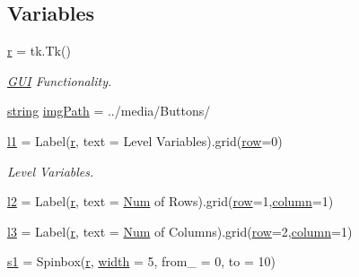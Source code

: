 \subsection*{Variables}
\begin{DoxyCompactItemize}
\item 
\mbox{\hyperlink{namespace_g_u_i_a75551f8a671434e8c984ec81add33a23}{r}} = tk.\+Tk()
\begin{DoxyCompactList}\small\item\em \mbox{\hyperlink{namespace_g_u_i}{G\+UI}} Functionality. \end{DoxyCompactList}\item 
\mbox{\hyperlink{asdl_8h_ae84541b4f3d8e1ea24ec0f466a8c568b}{string}} \mbox{\hyperlink{namespace_g_u_i_a293e22c0a27a45862ad50fcb8ed12f15}{img\+Path}} = \textquotesingle{}../media/Buttons/\textquotesingle{}
\item 
\mbox{\hyperlink{namespace_g_u_i_a95a82d369df3d4c7b727a9411b5200bf}{l1}} = Label(\mbox{\hyperlink{_s_d_l__opengl_8h_a42ce7cdc612e53abee15043f80220d97}{r}}, text = \textquotesingle{}Level Variables\textquotesingle{}).grid(\mbox{\hyperlink{_s_d_l__opengl__glext_8h_a90d3e7e4182a9630993f640fa0443b0b}{row}}=0)
\begin{DoxyCompactList}\small\item\em Level Variables. \end{DoxyCompactList}\item 
\mbox{\hyperlink{namespace_g_u_i_ac7c465b5857043b3fa99979abb72f6f8}{l2}} = Label(\mbox{\hyperlink{_s_d_l__opengl_8h_a42ce7cdc612e53abee15043f80220d97}{r}}, text = \textquotesingle{}\mbox{\hyperlink{_python-ast_8h_a8c8f50b76976c33a0eaa959e28d7b453}{Num}} of Rows\textquotesingle{}).grid(\mbox{\hyperlink{_s_d_l__opengl__glext_8h_a90d3e7e4182a9630993f640fa0443b0b}{row}}=1,\mbox{\hyperlink{_s_d_l__opengl__glext_8h_a0027cf4871ca9857e8e241960701189f}{column}}=1)
\item 
\mbox{\hyperlink{namespace_g_u_i_a35519123b77b2a3bdeaaa694185dd02a}{l3}} = Label(\mbox{\hyperlink{_s_d_l__opengl_8h_a42ce7cdc612e53abee15043f80220d97}{r}}, text = \textquotesingle{}\mbox{\hyperlink{_python-ast_8h_a8c8f50b76976c33a0eaa959e28d7b453}{Num}} of Columns\textquotesingle{}).grid(\mbox{\hyperlink{_s_d_l__opengl__glext_8h_a90d3e7e4182a9630993f640fa0443b0b}{row}}=2,\mbox{\hyperlink{_s_d_l__opengl__glext_8h_a0027cf4871ca9857e8e241960701189f}{column}}=1)
\item 
\mbox{\hyperlink{namespace_g_u_i_a9a674293f87e667971e46f422129f8be}{s1}} = Spinbox(\mbox{\hyperlink{_s_d_l__opengl_8h_a42ce7cdc612e53abee15043f80220d97}{r}}, \mbox{\hyperlink{_s_d_l__opengl_8h_a9a82cf3caff84cabc4598e2619faac17}{width}} = 5, from\+\_\+ = 0, to = 10)

\end{DoxyCompactItemize}
